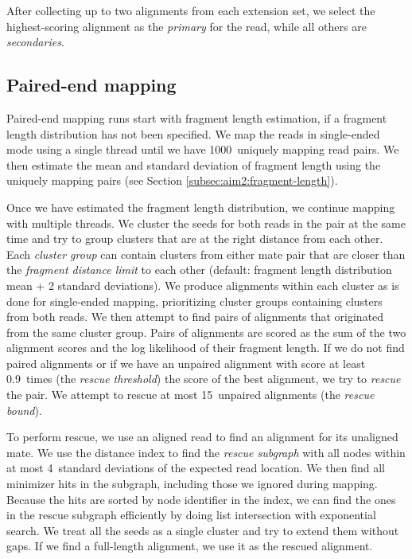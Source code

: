 \documentclass[11pt]{ucscthesis}
\newcommand{\param}[1]{\emph{#1}}
\newcommand{\vocab}[1]{\emph{#1}}
\begin{document}
After collecting up to two alignments from each extension set, we select the highest-scoring alignment as the \vocab{primary} for the read, while all others are \vocab{secondaries}.

\subsection{Paired-end mapping}

Paired-end mapping runs start with fragment length estimation, if a fragment length distribution has not been specified.
We map the reads in single-ended mode using a single thread until we have 1000~uniquely mapping read pairs.
We then estimate the mean and standard deviation of fragment length using the uniquely mapping pairs (see Section \ref{subsec:aim2:fragment-length}).

Once we have estimated the fragment length distribution, we continue mapping with multiple threads.
We cluster the seeds for both reads in the pair at the same time and try to group clusters that are at the right distance from each other.
Each \vocab{cluster group} can contain clusters from either mate pair that are closer than the \param{fragment distance limit} to each other (default: fragment length distribution mean + 2 standard deviations).
We produce alignments within each cluster as is done for single-ended mapping, prioritizing cluster groups containing clusters from both reads.
We then attempt to find pairs of alignments that originated from the same cluster group.
Pairs of alignments are scored as the sum of the two alignment scores and the log likelihood of their fragment length.
If we do not find paired alignments or if we have an unpaired alignment with score at least 0.9~times (the \param{rescue threshold}) the score of the best alignment, we try to \vocab{rescue} the pair.
We attempt to rescue at most 15~unpaired alignments (the \param{rescue bound}).

To perform rescue, we use an aligned read to find an alignment for its unaligned mate. We use the distance index to find the \vocab{rescue subgraph} with all nodes within at most 4~standard deviations of the expected read location.
We then find all minimizer hits in the subgraph, including those we ignored during mapping.
Because the hits are sorted by node identifier in the index, we can find the ones in the rescue subgraph efficiently by doing list intersection with exponential search.
We treat all the seeds as a single cluster and try to extend them without gaps.
If we find a full-length alignment, we use it as the rescued alignment.
\end{document}
